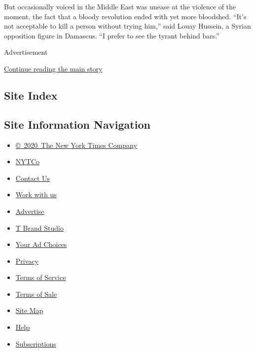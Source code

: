 But occasionally voiced in the Middle East was unease at the violence of
the moment, the fact that a bloody revolution ended with yet more
bloodshed. ``It's not acceptable to kill a person without trying him,''
said Louay Hussein, a Syrian opposition figure in Damascus. ``I prefer
to see the tyrant behind bars.''

Advertisement

\protect\hyperlink{after-bottom}{Continue reading the main story}

\hypertarget{site-index}{%
\subsection{Site Index}\label{site-index}}

\hypertarget{site-information-navigation}{%
\subsection{Site Information
Navigation}\label{site-information-navigation}}

\begin{itemize}
\tightlist
\item
  \href{https://help.nytimes3xbfgragh.onion/hc/en-us/articles/115014792127-Copyright-notice}{©~2020~The
  New York Times Company}
\end{itemize}

\begin{itemize}
\tightlist
\item
  \href{https://www.nytco.com/}{NYTCo}
\item
  \href{https://help.nytimes3xbfgragh.onion/hc/en-us/articles/115015385887-Contact-Us}{Contact
  Us}
\item
  \href{https://www.nytco.com/careers/}{Work with us}
\item
  \href{https://nytmediakit.com/}{Advertise}
\item
  \href{http://www.tbrandstudio.com/}{T Brand Studio}
\item
  \href{https://www.nytimes3xbfgragh.onion/privacy/cookie-policy\#how-do-i-manage-trackers}{Your
  Ad Choices}
\item
  \href{https://www.nytimes3xbfgragh.onion/privacy}{Privacy}
\item
  \href{https://help.nytimes3xbfgragh.onion/hc/en-us/articles/115014893428-Terms-of-service}{Terms
  of Service}
\item
  \href{https://help.nytimes3xbfgragh.onion/hc/en-us/articles/115014893968-Terms-of-sale}{Terms
  of Sale}
\item
  \href{https://spiderbites.nytimes3xbfgragh.onion}{Site Map}
\item
  \href{https://help.nytimes3xbfgragh.onion/hc/en-us}{Help}
\item
  \href{https://www.nytimes3xbfgragh.onion/subscription?campaignId=37WXW}{Subscriptions}
\end{itemize}
